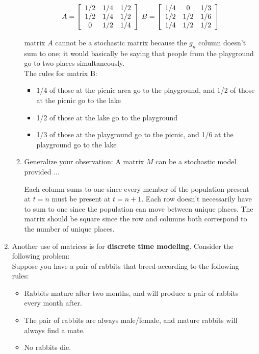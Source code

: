 \documentclass{letter}
\newcommand\Que[1]{%
   \leavevmode\noindent
   #1
}
\newcommand\Ans[2][]{%
   \leavevmode\noindent
   {
       \begin{mdframed}[backgroundcolor=blue!10]
       #2
       \end{mdframed}
   }
}
\newenvironment{Mat}[1]{%
  \left[\begin{array}{*{#1}{c}}
}{%
  \end{array}\right]
}
\begin{document}
\begin{enumerate}
\begin{enumerate}[label=(\alph*)]
{    \[
    A = \begin{Mat}{3}
            1/2 & 1/4 & 1/2 \\
            1/2 & 1/4 & 1/2 \\
            0   & 1/2 & 1/4
          \end{Mat} 
    \text{  } 
    B = \begin{Mat}{3}
            1/4 &   0 & 1/3 \\
            1/2 & 1/2 & 1/6 \\
            1/4 & 1/2 & 1/2
        \end{Mat}
    \]
    } 
    \Ans{matrix $A$ cannot be a stochastic matrix because the $g_n$ column doesn't sum to one; it would basically be saying that people from the playground go to two places simultaneously.  \\
    The rules for matrix B:
    \begin{itemize}
      \item 1/4 of those at the picnic area go to the playground, and 1/2 of those at the picnic go to the lake
      \item 1/2 of those at the lake go to the playground
      \item 1/3 of those at the playground go to the picnic, and 1/6 at the playground go to the lake
    \end{itemize}
    }
    \item \Que{Generalize your observation: A matrix $M$ can be a stochastic model provided ...}
    \Ans{
    Each column sums to one since every member of the population present at $t=n$ must be present at $t=n+1$.
    Each row doesn't necessarily have to sum to one since the population can move between unique places. 
    The matrix should be square since the row and columns both correspond to the number of unique places.
    }
    \end{enumerate}
    \newpage
    \item Another use of matrices is for \textbf{discrete time modeling}.  Consider the following problem:\\
    Suppose you have a pair of rabbits that breed according to the following rules:
      \begin{itemize}
        \item Rabbits mature after two months, and will produce a pair of rabbits every month after.
        \item The pair of rabbits are always male/female, and mature rabbits will always find a mate.
        \item No rabbits die.

\end{itemize}
\end{enumerate}
\end{document}
